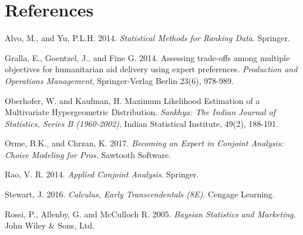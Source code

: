 \documentclass[a4paper, 12pt]{article}
\begin{document}
\section*{References}
\begin{list}{}{\itemindent=-2em}
\small
\item Alvo, M., and Yu, P.L.H. 2014. \emph{Statistical Methods for Ranking Data}. Springer.

\item Gralla, E., Goentzel, J., and Fine G. 2014. Assessing trade-offs among multiple objectives for humanitarian aid delivery using expert preferences.
\emph{Production and Operations Management}, Springer-Verlag Berlin 23(6), 978-989.

\item Oberhofer, W. and Kaufman, H. Maximum Likelihood Estimation of a Multivariate Hypergeometric Distribution. \emph{Sankhya: The Indian Journal of Statistics, Series B (1960-2002)}, Indian Statistical Institute, 49(2), 188-191. 

\item Orme, B.K., and Chrzan, K. 2017. \emph{Becoming an Expert in Conjoint Analysis: Choice Modeling for Pros.} Sawtooth Software.

\item Rao, V. R. 2014. \emph{Applied Conjoint Analysis}. Springer.

\item  Stewart, J. 2016.  \emph{Calculus, Early Transcendentals (8E)}. Cengage Learning.

\item Rossi, P., Allenby, G. and McCulloch R. 2005. \emph{Baysian Statistics and Marketing.} John Wiley \& Sons, Ltd.


\end{list}
\end{document}
